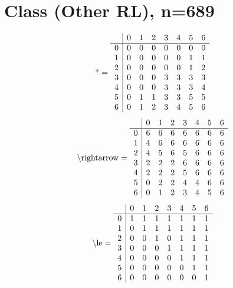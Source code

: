 \documentclass[11pt]{article}
\begin{document}
\section{Class (Other RL), n=689}
\[\text{*} = 
\begin{array}{r | r r r r r r r}
 & 0 & 1 & 2 & 3 & 4 & 5 & 6 \\ \hline
0 & 0 & 0 & 0 & 0 & 0 & 0 & 0 \\
1 & 0 & 0 & 0 & 0 & 0 & 1 & 1 \\
2 & 0 & 0 & 0 & 0 & 0 & 1 & 2 \\
3 & 0 & 0 & 0 & 3 & 3 & 3 & 3 \\
4 & 0 & 0 & 0 & 3 & 3 & 3 & 4 \\
5 & 0 & 1 & 1 & 3 & 3 & 5 & 5 \\
6 & 0 & 1 & 2 & 3 & 4 & 5 & 6 \\
\end{array}
\]
\[\text{\textbackslash rightarrow} = 
\begin{array}{r | r r r r r r r}
 & 0 & 1 & 2 & 3 & 4 & 5 & 6 \\ \hline
0 & 6 & 6 & 6 & 6 & 6 & 6 & 6 \\
1 & 4 & 6 & 6 & 6 & 6 & 6 & 6 \\
2 & 4 & 5 & 6 & 5 & 6 & 6 & 6 \\
3 & 2 & 2 & 2 & 6 & 6 & 6 & 6 \\
4 & 2 & 2 & 2 & 5 & 6 & 6 & 6 \\
5 & 0 & 2 & 2 & 4 & 4 & 6 & 6 \\
6 & 0 & 1 & 2 & 3 & 4 & 5 & 6 \\
\end{array}
\]
\[\text{\textbackslash le} = 
\begin{array}{r | r r r r r r r}
 & 0 & 1 & 2 & 3 & 4 & 5 & 6 \\ \hline
0 & 1 & 1 & 1 & 1 & 1 & 1 & 1 \\
1 & 0 & 1 & 1 & 1 & 1 & 1 & 1 \\
2 & 0 & 0 & 1 & 0 & 1 & 1 & 1 \\
3 & 0 & 0 & 0 & 1 & 1 & 1 & 1 \\
4 & 0 & 0 & 0 & 0 & 1 & 1 & 1 \\
5 & 0 & 0 & 0 & 0 & 0 & 1 & 1 \\
6 & 0 & 0 & 0 & 0 & 0 & 0 & 1 \\
\end{array}
\]
\end{document}
